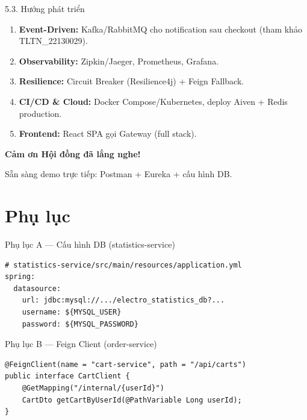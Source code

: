 \documentclass[aspectratio=169,12pt]{beamer}
\begin{document}
\begin{frame}{5.3. Hướng phát triển}
  \begin{enumerate}
    \item \textbf{Event-Driven:} Kafka/RabbitMQ cho notification sau checkout (tham khảo TLTN\_22130029).
    \item \textbf{Observability:} Zipkin/Jaeger, Prometheus, Grafana.
    \item \textbf{Resilience:} Circuit Breaker (Resilience4j) + Feign Fallback.
    \item \textbf{CI/CD \& Cloud:} Docker Compose/Kubernetes, deploy Aiven + Redis production.
    \item \textbf{Frontend:} React SPA gọi Gateway (full stack).
  \end{enumerate}

  \vspace{1em}
  \centering
  \Large\textbf{Cảm ơn Hội đồng đã lắng nghe!}

  \vspace{0.5em}
  \normalsize Sẵn sàng demo trực tiếp: Postman + Eureka + cấu hình DB.
\end{frame}

\appendix
\section*{Phụ lục}

\begin{frame}[fragile]{Phụ lục A — Cấu hình DB (statistics-service)}
\begin{lstlisting}
# statistics-service/src/main/resources/application.yml
spring:
  datasource:
    url: jdbc:mysql://.../electro_statistics_db?...
    username: ${MYSQL_USER}
    password: ${MYSQL_PASSWORD}
\end{lstlisting}
\end{frame}

\begin{frame}[fragile]{Phụ lục B — Feign Client (order-service)}
\begin{lstlisting}
@FeignClient(name = "cart-service", path = "/api/carts")
public interface CartClient {
    @GetMapping("/internal/{userId}")
    CartDto getCartByUserId(@PathVariable Long userId);
}
\end{lstlisting}
\end{frame}
\end{document}
